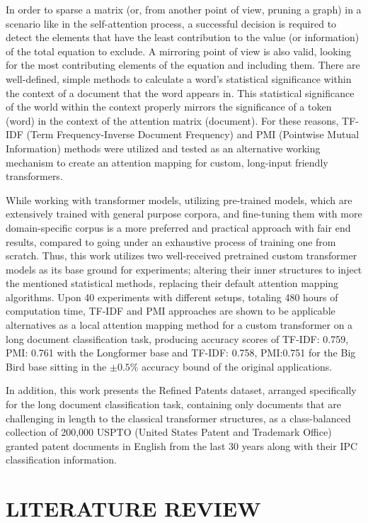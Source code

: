 \documentclass{iyte}
\begin{document}
In order to sparse a matrix (or, from another point of view, pruning a graph) in a scenario like in the self-attention process, a successful decision is required to detect the elements that have the least contribution to the value (or information) of the total equation to exclude. A mirroring point of view is also valid, looking for the most contributing elements of the equation and including them. There are well-defined, simple methods to calculate a word's statistical significance within the context of a document that the word appears in. This statistical significance of the world within the context properly mirrors the significance of a token (word) in the context of the attention matrix (document). For these reasons, TF-IDF (Term Frequency-Inverse Document Frequency) and PMI (Pointwise Mutual Information) methods were utilized and tested as an alternative working mechanism to create an attention mapping for custom, long-input friendly transformers.

While working with transformer models, utilizing pre-trained models, which are extensively trained with general purpose corpora, and fine-tuning them with more domain-specific corpus is a more preferred and practical approach with fair end results, compared to going under an exhaustive process of training one from scratch. Thus, this work utilizes two well-received pretrained custom transformer models as its base ground for experiments; altering their inner structures to inject the mentioned statistical methods, replacing their default attention mapping algorithms. Upon 40 experiments with different setups, totaling 480 hours of computation time, TF-IDF and PMI approaches are shown to be applicable alternatives as a local attention mapping method for a custom transformer on a long document classification task, producing accuracy scores of TF-IDF: 0.759, PMI: 0.761 with the Longformer base and TF-IDF: 0.758, PMI:0.751 for the Big Bird base sitting in the $\pm 0.5\%$ accuracy bound of the original applications.

In addition, this work presents the Refined Patents dataset, arranged specifically for the long document classification task, containing only documents that are challenging in length to the classical transformer structures, as a class-balanced collection of 200,000 USPTO (United States Patent and Trademark Office) granted patent documents in English from the last 30 years along with their IPC classification information.

\chapter{LITERATURE REVIEW}
\end{document}
